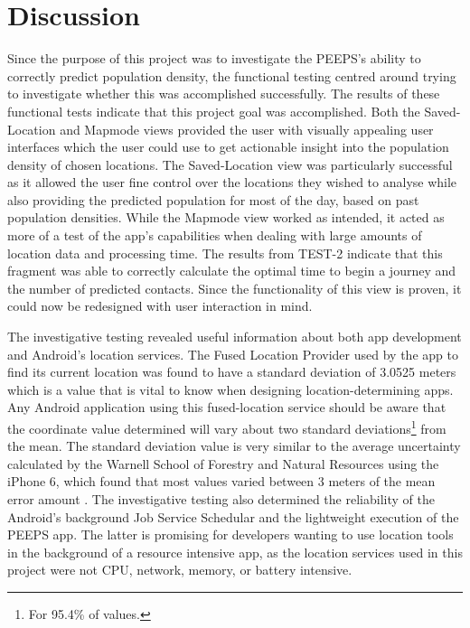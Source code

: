\section{Discussion}

Since the purpose of this project was to investigate the PEEPS's ability to correctly predict population density, the functional testing centred around trying to investigate whether this was accomplished successfully. The results of these functional tests indicate that this project goal was accomplished. Both the Saved-Location and Mapmode views provided the user with visually appealing user interfaces which the user could use to get actionable insight into the population density of chosen locations. The Saved-Location view was particularly successful as it allowed the user fine control over the locations they wished to analyse while also providing the predicted population for most of the day, based on past population densities. While the Mapmode view worked as intended, it acted as more of a test of the app's capabilities when dealing with large amounts of location data and processing time. The results from TEST-2 indicate that this fragment was able to correctly calculate the optimal time to begin a journey and the number of predicted contacts. Since the functionality of this view is proven, it could now be redesigned with user interaction in mind. 

The investigative testing revealed useful information about both app development and Android's location services. The Fused Location Provider used by the app to find its current location was found to have a standard deviation of 3.0525 meters which is a value that is vital to know when designing location-determining apps. Any Android application using this fused-location service should be aware that the coordinate value determined will vary about two standard deviations\footnote{For 95.4\% of values.} from the mean. The standard deviation value is very similar to the average uncertainty calculated by the Warnell School of Forestry and Natural Resources using the iPhone 6, which found that most values varied between 3 meters of the mean error amount \cite{Merry2019}. The investigative testing also determined the reliability of the Android's background Job Service Schedular and the lightweight execution of the PEEPS app. The latter is promising for developers wanting to use location tools in the background of a resource intensive app, as the location services used in this project were not CPU, network, memory, or battery intensive.  